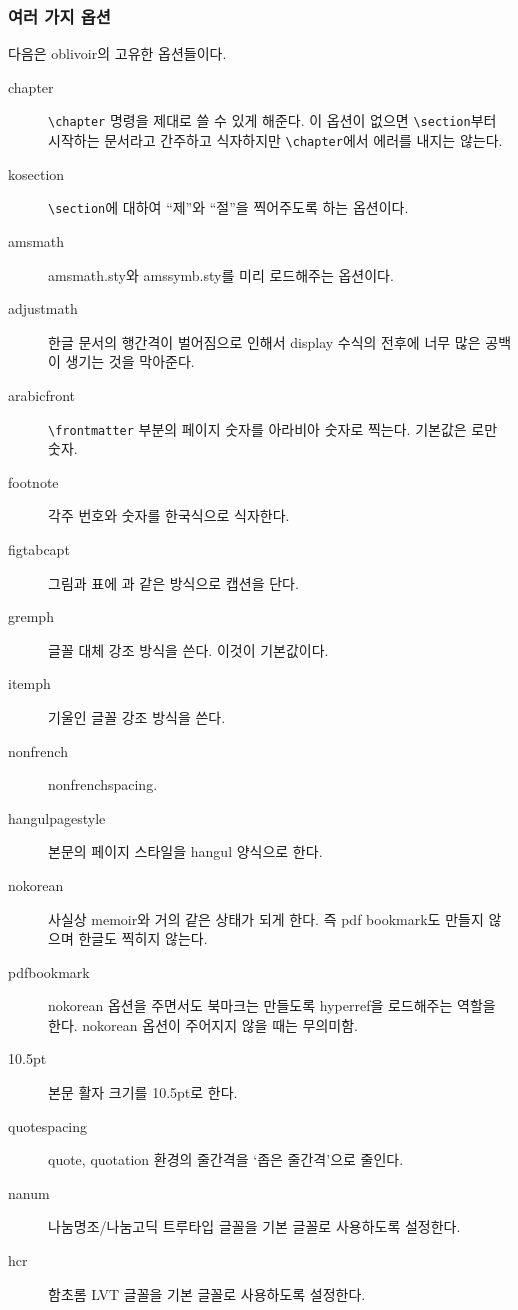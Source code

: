 \documentclass[
	12pt,
	a4paper,
	kosection,
	footnote,
	nobookmarks,
	microtype,
]{oblivoir}
\newcommand\obclass{ob\-liv\-oir\oblivoirallowbreak}
\begin{document}
\subsubsection{여러 가지 옵션}

다음은 \obclass 의 고유한 옵션들이다. 
\begin{description}
\item [chapter] \verb|\chapter| 명령을 제대로 쓸 수 있게 해준다. 이 옵션이 없으면  \verb|\section|부터 시작하는 문서라고 간주하고 식자하지만 \verb|\chapter|에서 에러를 내지는 않는다.
\item [kosection] \verb|\section|에 대하여 ``제''와 ``절''을 찍어주도록 하는 옵션이다.
\item [amsmath] amsmath.sty와 amssymb.sty를 미리 로드해주는 옵션이다.
\item [adjustmath] 한글 문서의 행간격이 벌어짐으로 인해서 display 수식의 전후에 너무 많은 공백이 생기는 것을 막아준다.
\item [arabicfront] \verb|\frontmatter| 부분의 페이지 숫자를 아라비아 숫자로 찍는다. 기본값은 로만 숫자.
\item [footnote] 각주 번호와 숫자를 한국식으로 식자한다.
\item [figtabcapt] 그림과 표에 과 같은 방식으로 캡션을 단다.
\item [gremph] 글꼴 대체 강조 방식을 쓴다. 이것이 기본값이다.
\item [itemph] 기울인 글꼴 강조 방식을 쓴다.
\item [nonfrench] nonfrenchspacing.
\item [hangulpagestyle] 본문의 페이지 스타일을 hangul 양식으로 한다.
\item [nokorean] 사실상 memoir와 거의 같은 상태가 되게 한다. 즉 pdf bookmark도 만들지 않으며 한글도 찍히지 않는다.
\item [pdfbookmark] nokorean 옵션을 주면서도 북마크는 만들도록 hyperref을 로드해주는 역할을 한다. nokorean 옵션이 주어지지 않을 때는 무의미함.
\item [10.5pt] 본문 활자 크기를 10.5pt로 한다.
\item [quotespacing] quote, quotation 환경의 줄간격을 `좁은 줄간격'으로 줄인다.
\item [nanum] 나눔명조/나눔고딕 트루타입 글꼴을 기본 글꼴로 사용하도록 설정한다.
\item [hcr]   함초롬 LVT 글꼴을 기본 글꼴로 사용하도록 설정한다.
\end{description}
\end{document}
